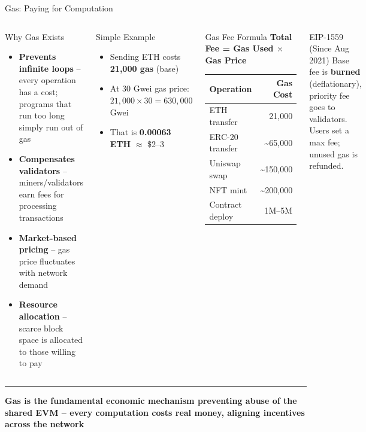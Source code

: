 \documentclass[8pt,aspectratio=169]{beamer}
\newcommand{\bottomnote}[1]{\vfill\vspace{-2mm}\textcolor{mllavender2}{\rule{\textwidth}{0.4pt}}\vspace{1mm}\footnotesize\textbf{#1}}
\begin{document}
\begin{frame}{Gas: Paying for Computation}
\begin{columns}[T]
\begin{block}{Why Gas Exists}
\footnotesize
\begin{itemize}
  \item \textbf{Prevents infinite loops} -- every operation has a cost; programs that run too long simply run out of gas
  \item \textbf{Compensates validators} -- miners/validators earn fees for processing transactions
  \item \textbf{Market-based pricing} -- gas price fluctuates with network demand
  \item \textbf{Resource allocation} -- scarce block space is allocated to those willing to pay
\end{itemize}
\end{block}
\vspace{2mm}
\begin{exampleblock}{Simple Example}
\footnotesize
\begin{itemize}
  \item Sending ETH costs \textbf{21,000 gas} (base)
  \item At 30 Gwei gas price: $21{,}000 \times 30 = 630{,}000$ Gwei
  \item That is \textbf{0.00063 ETH} $\approx$ \$2--3
\end{itemize}
\end{exampleblock}

\begin{block}{Gas Fee Formula}
\footnotesize
\centering
\vspace{2mm}
\textcolor{mlpurple}{\textbf{Total Fee = Gas Used $\times$ Gas Price}}
\vspace{3mm}

\begin{tabular}{l r}
\toprule
\textbf{Operation} & \textbf{Gas Cost} \\
\midrule
\rowcolor{mllavender4}
ETH transfer & 21,000 \\
ERC-20 transfer & \textasciitilde65,000 \\
\rowcolor{mllavender4}
Uniswap swap & \textasciitilde150,000 \\
NFT mint & \textasciitilde200,000 \\
\rowcolor{mllavender4}
Contract deploy & 1M--5M \\
\bottomrule
\end{tabular}
\end{block}
\vspace{2mm}
\begin{alertblock}{EIP-1559 (Since Aug 2021)}
\footnotesize
Base fee is \textbf{burned} (deflationary), priority fee goes to validators. Users set a max fee; unused gas is refunded.
\end{alertblock}
\end{columns}
\bottomnote{Gas is the fundamental economic mechanism preventing abuse of the shared EVM -- every computation costs real money, aligning incentives across the network}
\end{frame}
\end{document}
